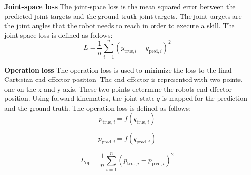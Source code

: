 \documentclass[
	a4paper, %
	10pt, %
	unnumberedsections, %
	twoside, %
]{LTJournalArticle}
\begin{document}
\par
\textbf{Joint-space loss}
The joint-space loss is the mean squared error between the predicted joint targets and the ground truth joint targets. The joint targets are the joint
angles that the robot needs to reach in order to execute a skill. The joint-space loss is defined as follows:
\begin{equation}
	L = \frac{1}{n} \sum_{i=1}^{n} (y_{\text{true},i} - y_{\text{pred},i})^2
\end{equation}

\par
\textbf{Operation loss}
The operation loss is used to minimize the loss to the final Cartesian end-effector position. The end-effector is represented with two points, one on the
x and y axis. These two points determine the robots end-effector position. Using forward kinematics, the joint state \(q\) is mapped for the prediction and the
ground truth. The operation loss is defined as follows:
\begin{equation}
	p_{\text{true},i} = f(q_{\text{true},i})
\end{equation}
	
\begin{equation}
	p_{\text{pred},i} = f(q_{\text{pred},i})
\end{equation}
	
\begin{equation}
	L_{\text{op}} = \frac{1}{n} \sum_{i=1}^{n} (p_{\text{true},i} - p_{\text{pred},i})^2
\end{equation}
\end{document}
